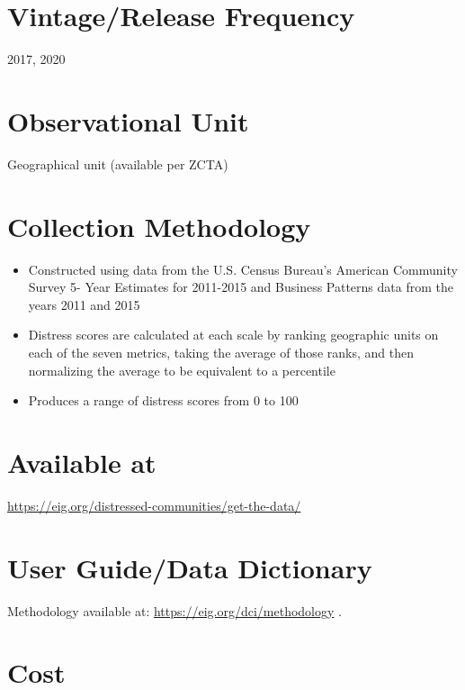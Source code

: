 \documentclass[
]{book}
\providecommand{\tightlist}{%
  \setlength{\itemsep}{0pt}\setlength{\parskip}{0pt}}
\begin{document}
\hypertarget{vintagerelease-frequency-22}{%
\section{Vintage/Release Frequency}\label{vintagerelease-frequency-22}}

2017, 2020

\hypertarget{observational-unit-22}{%
\section{Observational Unit}\label{observational-unit-22}}

Geographical unit (available per ZCTA)

\hypertarget{collection-methodology-22}{%
\section{Collection Methodology}\label{collection-methodology-22}}

\begin{itemize}
\tightlist
\item
  Constructed using data from the U.S. Census Bureau's American Community Survey 5- Year Estimates for 2011-2015 and Business Patterns data from the years 2011 and 2015
\item
  Distress scores are calculated at each scale by ranking geographic units on each of the seven metrics, taking the average of those ranks, and then normalizing the average to be equivalent to a percentile
\item
  Produces a range of distress scores from 0 to 100
\end{itemize}

\hypertarget{available-at-22}{%
\section{Available at}\label{available-at-22}}

\url{https://eig.org/distressed-communities/get-the-data/}

\hypertarget{user-guidedata-dictionary-22}{%
\section{User Guide/Data Dictionary}\label{user-guidedata-dictionary-22}}

Methodology available at: \url{https://eig.org/dci/methodology} .

\hypertarget{cost-22}{%
\section{Cost}\label{cost-22}}
\end{document}
